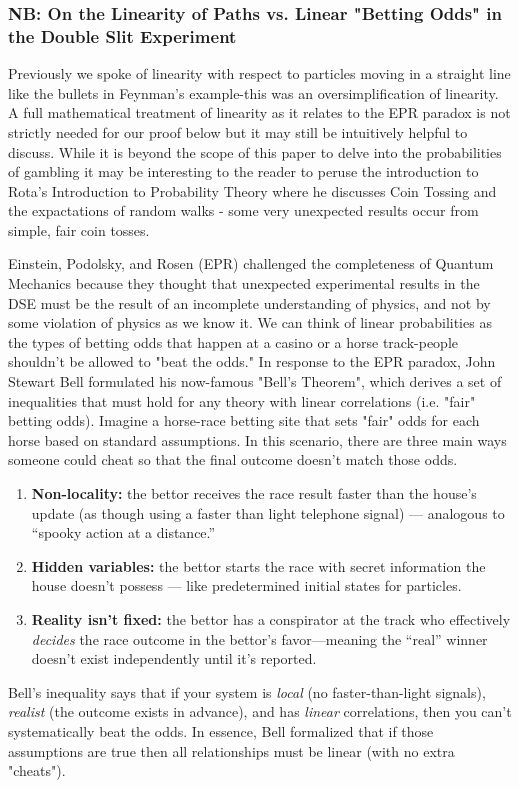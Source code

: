 \documentclass{article}
\begin{document}
\subsubsection*{NB: On the Linearity of Paths vs. Linear "Betting Odds" in the Double Slit Experiment}
Previously we spoke of linearity with respect to particles moving in a straight line like the bullets in Feynman's example-this was an oversimplification of linearity. A full mathematical treatment of linearity as it relates to the EPR paradox is not strictly needed for our proof below but it may still be intuitively helpful to discuss.  While it is beyond the scope of this paper to delve into the probabilities of gambling it may be interesting to the reader to peruse the introduction to Rota's Introduction to Probability Theory\cite{Rota1997} where he discusses Coin Tossing and the expactations of random walks - some very unexpected results occur from simple, fair coin tosses.\cite{Rota1985} 

Einstein, Podolsky, and Rosen (EPR) challenged the completeness of Quantum Mechanics because they thought that unexpected experimental results in the DSE must be the result of an incomplete understanding of physics, and not by some violation of physics as we know it. We can think of linear probabilities as the types of betting odds that happen at a casino or a horse track-people shouldn't be allowed to "beat the odds." In response to the EPR paradox, John Stewart Bell formulated his now-famous "Bell's Theorem", which derives a set of inequalities that must hold for any theory with linear correlations (i.e. "fair" betting odds). Imagine a horse-race betting site that sets "fair" odds for each horse based on standard assumptions. In this scenario, there are three main ways someone could cheat so that the final outcome doesn't match those odds. 
\begin{enumerate}
    \item \textbf{Non-locality:} the bettor receives the race result faster than the house's update (as though using a faster than light telephone signal) — analogous to “spooky action at a distance.”
    \item \textbf{Hidden variables:} the bettor starts the race with secret information the house doesn’t possess — like predetermined initial states for particles.
    \item \textbf{Reality isn’t fixed:} the bettor has a conspirator at the track who effectively \textit{decides} the race outcome in the bettor’s favor—meaning the “real” winner doesn’t exist independently until it’s reported.
\end{enumerate}
Bell’s inequality says that if your system is \textit{local} (no faster-than-light signals), \textit{realist} (the outcome exists in advance), and has \textit{linear} correlations, then you can’t systematically beat the odds. In essence, Bell formalized that if those assumptions are true then all relationships must be linear (with no extra "cheats").
\end{document}
